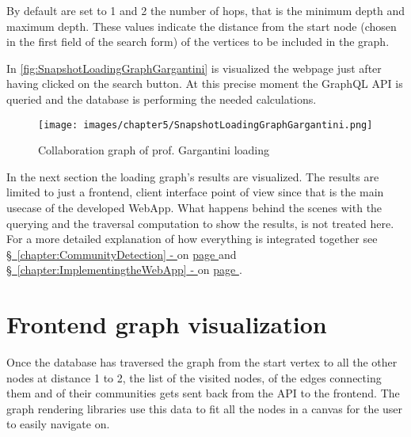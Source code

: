 By default are set to 1 and 2 the number of hops, that is the minimum depth and maximum depth. These values indicate the distance from the start node (chosen in the first field of the search form) of the vertices to be included in the graph.

In \hyperref[fig:SnapshotLoadingGraphGargantini]{\autoref{fig:SnapshotLoadingGraphGargantini}} is visualized the webpage just after having clicked on the search button. At this precise moment the \gls{GraphQL} \acrshort{API} is queried and the database is performing the needed calculations.

\begin{figure}[H]%
	\centering%
	\texttt{[image: images/chapter5/SnapshotLoadingGraphGargantini.png]}%
	\caption[Collaboration graph of prof. Gargantini loading]{Collaboration graph of prof. Gargantini loading}%
	\label{fig:SnapshotLoadingGraphGargantini}%
\end{figure}%

In the next section the loading graph's results are visualized.
The results are limited to just a frontend, client interface point of view since that is the main usecase of the developed \gls{WebApp}.
What happens behind the scenes with the querying and the traversal computation to show the results, is not treated here.
For a more detailed explanation of how everything is integrated together see \hyperref[chapter:CommunityDetection]{\S\ \ref{chapter:CommunityDetection} - } on \hyperref[chapter:CommunityDetection]{page \pageref*{chapter:CommunityDetection}} and  \hyperref[chapter:ImplementingtheWebApp]{\S\ \ref{chapter:ImplementingtheWebApp} - } on \hyperref[chapter:ImplementingtheWebApp]{page \pageref*{chapter:ImplementingtheWebApp}}.

\section{Frontend graph visualization} \label{section:Displayoftheresults/Frontendgraphvisualization}
Once the database has traversed the graph from the start vertex to all the other nodes at distance 1 to 2, the list of the visited nodes, of the edges connecting them and of their communities gets sent back from the \acrshort{API} to the frontend.
The graph rendering libraries use this data to fit all the nodes in a canvas for the user to easily navigate on.

